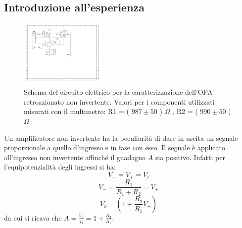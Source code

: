 \documentclass[journal]{IEEEtran}
\begin{document}
\subsection{\textbf{Introduzione all'esperienza}}
\begin{figure}[H]%
\begin {center}
\includegraphics[width=0.38\textwidth]{sch-simulations/output/OPA-closed-loop-non-inverting.pdf}
\caption{Schema del circuito elettrico per la caratterizzazione dell'OPA retroazionato non invertente. Valori per i componenti utilizzati misurati con il multimetro: R1 = ( $987 \pm 50$ ) $\Omega$ , R2 = ( $990 \pm 50$ ) $\Omega$}
\label{fig:loop-non-inv}
\end {center}
\end{figure}
Un amplificatore non invertente ha la peculiarità di dare in uscita un segnale proporzionale a quello d'ingresso e in fase con esso. Il segnale è applicato all'ingresso non invertente affinché il guadagno $A$ sia positivo. Infatti per l'equipotenzialità degli ingressi si ha: \[V_{-} = V_{+} = V_{i}\] \[V_{-} = \frac{R_1}{R_1+R_2}=V_{+}\] \[V_{o}=(1+\frac{R_2}{R_1}V_{+})\]
da cui si ricava che $A=\frac{V_{o}}{V_i}=1+\frac{R_2}{R_1}$.
\end{document}
